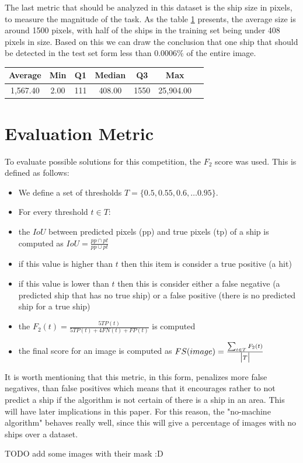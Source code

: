 The last metric that should be analyzed in this dataset is the ship size in pixels, to measure the magnitude of the task. As the table \ref{shipzisepixeltable} presents, the average size is around 1500 pixels, with half of the ships in the training set being under 408 pixels in size. Based on this we can draw the conclusion that one ship that should be detected in the test set form less than 0.0006\% of the entire image.

\begin{table}
	\centering
	\begin{tabular}{|c|c|c|c|c|c|l|}
		\hline
		Average & Min & Q1 & Median & Q3 & Max\\ \hline
		1,567.40 & 2.00	& 111 & 408.00 & 1550 & 25,904.00 \\ \hline
	\end{tabular}
	\label{shipzisepixeltable}
\end{table}

\section{Evaluation Metric}
To evaluate possible solutions for this competition, the $F_2$ score was used. This is defined as follows:
\begin{itemize}
	\item We define a set of thresholds $T = \{0.5, 0.55, 0.6, \dots 0.95\}$.
	\item For every threshold $t \in T$:
	\item the $IoU$ between predicted pixels (pp) and true pixels (tp) of a ship is computed as $IoU = \frac{pp \cap pt}{pp \cup pt}$
	\item if this value is higher than $t$ then this item is consider a true positive (a hit)
	\item if this value is lower than $t$ then this is consider either a false negative (a predicted ship that has no true ship) or a false positive (there is no predicted ship for a true ship)
	\item the $F_2(t) =\frac{5TP(t)}{5TP(t) +4FN(t) + FP(t)}$ is computed
	\item the final score for an image is computed as $FS(image) = \frac{\sum_{t \in T} F_2(t)}{\big{|}T\big{|}}$
\end{itemize}

It is worth mentioning that this metric, in this form, penalizes more false negatives, than false positives which means that it encourages rather to not predict a ship if the algorithm is not certain of there is a ship in an area. This will have later implications in this paper. For this reason, the "no-machine algorithm" behaves really well, since this will give a percentage of images with no ships over a dataset.

TODO add some images with their mask :D